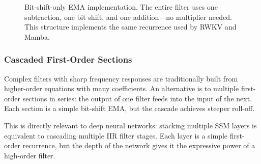 \begin{figure}[htbp]
\centering
{}
\caption{Bit-shift-only EMA implementation. The entire filter uses one
  subtraction, one bit shift, and one addition---no multiplier needed.
  This structure implements the same recurrence used by RWKV and Mamba.}
\label{fig:ema-bitshift}
\end{figure}

\subsubsection{Cascaded First-Order Sections}

Complex filters with sharp frequency responses are traditionally
built from higher-order equations with many coefficients. An
alternative is to  multiple first-order sections in
series: the output of one filter feeds into the input of the next.
Each section is a simple bit-shift EMA, but the cascade achieves
steeper roll-off.

This is directly relevant to deep neural networks: stacking multiple
SSM layers is equivalent to cascading multiple IIR filter stages.
Each layer is a simple first-order recurrence, but the depth of the
network gives it the expressive power of a high-order filter.

